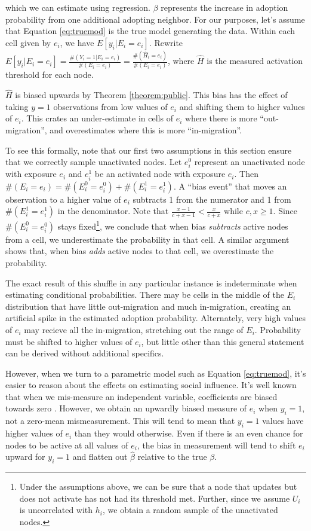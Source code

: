 \documentclass[a4paper]{article}
\begin{document}
\noindent
which we can estimate using regression. $\beta$ represents the increase in adoption probability from one additional adopting neighbor. For our purposes, let's assume that Equation \ref{eq:truemod} is the true model generating the data. Within each cell given by $e_i$, we have $E[y_i | E_i = e_i]$. Rewrite $E[y_i | E_i = e_i] = \frac{\#(Y_i = 1 | E_i = e_i)}{\#(E_i = e_i)} = \frac{\#(\hat{H}_i = e_i)}{\#(E_i = e_i)}$, where $\hat{H}$ is the measured activation threshold for each node.

$\hat{H}$ is biased upwards by Theorem \ref{theorem:public}. This bias has the effect of taking $y = 1$ observations from low values of $e_i$ and shifting them to higher values of $e_i$. This crates an under-estimate in cells of $e_i$ where there is more ``out-migration'', and overestimates where this is more ``in-migration''.

To see this formally, note that our first two assumptions in this section ensure that we correctly sample unactivated nodes. Let $e_i^0$ represent an unactivated node with exposure $e_i$ and $e_i^1$ be an activated node with exposure $e_i$. Then $\#(E_i = e_i) = \#(E_i^0 = e_i^0) + \#(E_i^1 = e_i^1)$. A ``bias event'' that moves an observation to a higher value of $e_i$ subtracts 1 from the numerator and 1 from $\#(E_i^1 = e_i^1)$ in the denominator. Note that $\frac{x - 1}{c + x - 1} < \frac{x}{c + x}$ while $c, x \ge 1$. Since $\#(E_i^0 = e_i^0)$ stays fixed\footnote{Under the assumptions above, we can be sure that a node that updates but does not activate has not had its threshold met. Further, since we assume $U_i$ is uncorrelated with $h_i$, we obtain a random sample of the unactivated nodes.}, we conclude that when bias \emph{subtracts} active nodes from a cell, we underestimate the probability in that cell. A similar argument shows that, when bias \emph{adds} active nodes to that cell, we overestimate the probability.

The exact result of this shuffle in any particular instance is indeterminate when estimating conditional probabilities. There may be cells in the middle of the $E_i$ distribution that have little out-migration and much in-migration, creating an artificial spike in the estimated adoption probability. Alternately, very high values of $e_i$ may recieve all the in-migration, stretching out the range of $E_i$. Probability must be shifted to higher values of $e_i$, but little other than this general statement can be derived without additional specifics.

However, when we turn to a parametric model such as Equation \ref{eq:truemod}, it's easier to reason about the effects on estimating social influence. It's well known that when we mis-measure an independent variable, coefficients are biased towards zero \parencite{frost2000}. However, we obtain an upwardly biased measure of $e_i$ when $y_i = 1$, not a zero-mean mismeasurement. This will tend to mean that $y_i = 1$ values have higher values of $e_i$ than they would otherwise. Even if there is an even chance for nodes to be active at all values of $e_i$, the bias in measurement will tend to shift $e_i$ upward for $y_i = 1$ and flatten out $\hat{\beta}$ relative to the true $\beta$.
\end{document}
